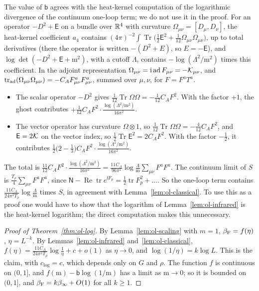 \begin{remark}\label{rem:ol-heat-kernel}
The value of $\mathsf b$ agrees with the heat-kernel computation of the logarithmic divergence of the continuum one-loop term; we do not use it in the proof. For an operator $-D^2+\mathsf E$ on a bundle over $\mathbb R^4$ with curvature $\Omega_{\mu\nu}=[D_\mu,D_\nu]$, the heat-kernel coefficient $a_4$ contains $(4\pi)^{-2}\int\operatorname{Tr}\big(\frac12\mathsf E^2+\frac1{12}\Omega_{\mu\nu}\Omega_{\mu\nu}\big)$, up to total derivatives \cite{Vassilevich} (there the operator is written $-(D^2+E)$, so $E=-\mathsf E$), and $\log\det(-D^2+\mathsf E+\mathrm m^2)$, with a cutoff $\Lambda$, contains $-\log(\Lambda^2/\mathrm m^2)$ times this coefficient. In the adjoint representation $\Omega_{\mu\nu}=\mathrm i\operatorname{ad}F_{\mu\nu}=-\mathcal K_{\mu\nu}$, and $\operatorname{tr}_{\rm ad}(\Omega_{\mu\nu}\Omega_{\mu\nu})=-C_AF^a_{\mu\nu}F^a_{\mu\nu}$, summed over $\mu,\nu$, for $F=F^aT^a$.
\begin{itemize}
\item The scalar operator $-D^2$ gives $\frac1{12}\operatorname{Tr}\Omega\Omega=-\frac1{12}C_AF^2$. With the factor $+1$, the ghost contributes $+\frac1{12}C_AF^2\cdot\frac{\log(\Lambda^2/\mathrm m^2)}{16\pi^2}$.
\item The vector operator has curvature $\Omega\otimes1$, so $\frac1{12}\operatorname{Tr}\Omega\Omega=-\frac4{12}C_AF^2$, and $\mathsf E=2\mathcal K$ on the vector index, so $\frac12\operatorname{Tr}\mathsf E^2=2C_AF^2$. With the factor $-\frac12$, it contributes $\frac12\big(2-\frac13\big)C_AF^2\cdot\frac{\log(\Lambda^2/\mathrm m^2)}{16\pi^2}$.
\end{itemize}
The total is $\frac{11}{12}C_AF^2\cdot\frac{\log(\Lambda^2/\mathrm m^2)}{16\pi^2}=\frac{11C_A}{96\pi^2}\log\frac\Lambda{\mathrm m}\sum_{\mu\nu}F^aF^a$. The continuum limit of $S$ is $\frac{T_\rho}4\sum_{\mu\nu}F^aF^a$, since $\mathsf N-\operatorname{Re}\operatorname{tr}e^{\ii F_p}=\frac12\operatorname{tr}F_p^2+\dots$. So the one-loop term contains $\frac{11C_A}{24\pi^2T_\rho}\log\frac\Lambda{\mathrm m}$ times $S$, in agreement with Lemma~\ref{lem:ol-classical}. To use this as a proof one would have to show that the logarithm of Lemma~\ref{lem:ol-infrared} is the heat-kernel logarithm; the direct computation makes this unnecessary.
\end{remark}

\begin{proof}[Proof of Theorem~\ref{thm:ol-log}]
By Lemma~\ref{lem:ol-scaling} with $m=1$, $\beta_{\rm F}=f(\eta)$, $\eta=L^{-k}$. By Lemmas~\ref{lem:ol-infrared} and~\ref{lem:ol-classical}, $f(\eta)=\frac{11C_A}{24\pi^2T_\rho}\log\frac1\eta+c+o(1)$ as $\eta\to0$, and $\log(1/\eta)=k\log L$. This is the claim, with $c_{\log}=c$, which depends only on $G$ and $\rho$. The function $f$ is continuous on $(0,1]$, and $f(\mathrm m)-\mathsf b\log(1/\mathrm m)$ has a limit as $\mathrm m\to0$; so it is bounded on $(0,1]$, and $\beta_{\rm F}=k\beta_\infty+O(1)$ for all $k\ge1$.
\end{proof}

